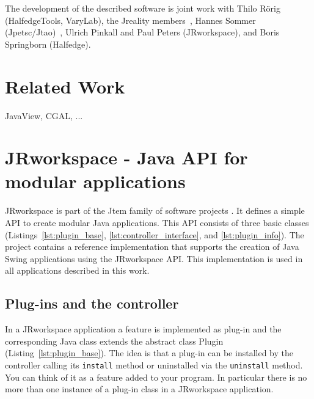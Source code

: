 The development of the described software is joint work with Thilo R{\" o}rig 
({\sc HalfedgeTools, VaryLab}), the {\sc Jreality} members~\cite{JrealityWebsite}, Hannes 
Sommer ({\sc Jpetsc/Jtao})~\cite{jpetsctao-web-page}, Ulrich Pinkall and Paul Peters 
({\sc JRworkspace}), and Boris Springborn ({\sc Halfedge}).


\section{Related Work}
\label{sec:related_work}
JavaView, CGAL, ...

\section{{\sc JRworkspace} - Java API for modular applications}
\label{sec:jrworkspace}


{\sc JRworkspace} is part of the {\sc Jtem} family of software projects 
\cite{JtemWebsite}. It defines a simple API to create modular Java applications. This API consists of
three basic classes (Listings~\ref{lst:plugin_base}, \ref{lst:controller_interface}, and 
\ref{lst:plugin_info}).
The project contains a reference implementation that supports the creation of Java
Swing applications using the {\sc JRworkspace} API. This implementation is used in all 
applications described in this work.

\subsection{Plug-ins and the controller}

In a {\sc JRworkspace} application a feature is implemented as plug-in and the corresponding Java class 
extends the abstract class Plugin
(Listing~\ref{lst:plugin_base}). The idea is that a plug-in can be installed by the controller 
calling its {\tt install} method or uninstalled via the {\tt uninstall} method. You can think of it 
as a feature added to your program. In particular there is no more than one instance of a
plug-in class in a {\sc JRworkspace} application.

